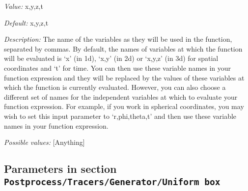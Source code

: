 \begin{itemize}
{\it Value:} x,y,z,t


{\it Default:} x,y,z,t


{\it Description:} The name of the variables as they will be used in the function, separated by commas. By default, the names of variables at which the function will be evaluated is `x' (in 1d), `x,y' (in 2d) or `x,y,z' (in 3d) for spatial coordinates and `t' for time. You can then use these variable names in your function expression and they will be replaced by the values of these variables at which the function is currently evaluated. However, you can also choose a different set of names for the independent variables at which to evaluate your function expression. For example, if you work in spherical coordinates, you may wish to set this input parameter to `r,phi,theta,t' and then use these variable names in your function expression.


{\it Possible values:} [Anything]
\end{itemize}

\subsection{Parameters in section \tt Postprocess/Tracers/Generator/Uniform box}
\label{parameters:Postprocess/Tracers/Generator/Uniform_20box}

